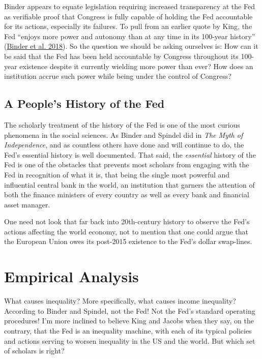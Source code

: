 \documentclass[
  11pt,
]{article}
\begin{document}
Binder appears to equate legislation requiring increased transparency at
the Fed as verifiable proof that Congress is fully capable of holding
the Fed accountable for its actions, especially its failures. To pull
from an earlier quote by King, the Fed ``enjoys more power and autonomy
than at any time in its 100-year history''
(\protect\hyperlink{ref-binder2018c}{Binder et al. 2018}). So the
question we should be asking ourselves is: How can it be said that the
Fed has been held accountable by Congress throughout its 100-year
existence despite it currently wielding more power than ever? How does
an institution accrue such power while being under the control of
Congress?

\hypertarget{a-peoples-history-of-the-fed}{%
\subsection{A People's History of the
Fed}\label{a-peoples-history-of-the-fed}}

The scholarly treatment of the history of the Fed is one of the most
curious phenomena in the social sciences. As Binder and Spindel did in
\emph{The Myth of Independence}, and as countless others have done and
will continue to do, the Fed's essential history is well documented.
That said, the \emph{essential} history of the Fed is one of the
obstacles that prevents most scholars from engaging with the Fed in
recognition of what it is, that being the single most powerful and
influential central bank in the world, an institution that garners the
attention of both the finance ministers of every country as well as
every bank and financial asset manager.

One need not look that far back into 20th-century history to observe the
Fed's actions affecting the world economy, not to mention that one could
argue that the European Union owes its post-2015 existence to the Fed's
dollar swap-lines.

\hypertarget{empirical-analysis}{%
\section{Empirical Analysis}\label{empirical-analysis}}

What causes inequality? More specifically, what causes income
inequality? According to Binder and Spindel, not the Fed! Not the Fed's
standard operating procedures! I'm more inclined to believe King and
Jacobs when they say, on the contrary, that the Fed is an inequality
machine, with each of its typical policies and actions serving to worsen
inequality in the US and the world. But which set of scholars is right?
\end{document}
